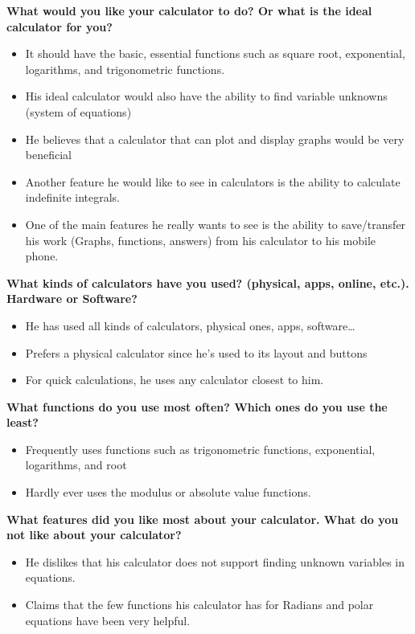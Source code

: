 \documentclass{article}
\begin{document}
\textbf{What would you like your calculator to do? Or what is the ideal calculator for you?}
\begin{itemize}
\itemsep0em 
\item It should have the basic, essential functions such as square root, exponential, logarithms, and trigonometric functions.
\item His ideal calculator would also have the ability to find variable unknowns (system of equations) 
\item He believes that a calculator that can plot and display graphs would be very beneficial
\item Another feature he would like to see in calculators is the ability to calculate indefinite integrals.
\item One of the main features he really wants to see is the ability to save/transfer his work (Graphs, functions, answers) from his calculator to his mobile phone.
\end{itemize}

\textbf{What kinds of calculators have you used? (physical, apps, online, etc.). Hardware or Software?}
\begin{itemize}
\itemsep0em 
\item He has used all kinds of calculators, physical ones, apps, software…
\item Prefers a physical calculator since he’s used to its layout and buttons
\item For quick calculations, he uses any calculator closest to him.
\end{itemize}

\textbf{What functions do you use most often? Which ones do you use the least?}
\begin{itemize}
\itemsep0em 
\item Frequently uses functions such as trigonometric functions, exponential, logarithms, and root
\item Hardly ever uses the modulus or absolute value functions.
\end{itemize}

\textbf{What features did you like most about your calculator. What do you not like about your calculator?}
\begin{itemize}
\itemsep0em 
\item He dislikes that his calculator does not support finding unknown variables in equations.
\item Claims that the few functions his calculator has for Radians and polar equations have been very helpful.
\end{itemize}
\end{document}
